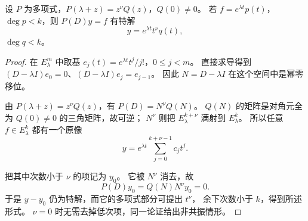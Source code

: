 \begin{proposition}[非齐次项与共振]
设 $P$ 为多项式，$P(\lambda+z)=z^\nu Q(z)$，$Q(0)\ne0$。
若 $f=e^{\lambda t}p(t)$，$\deg p<k$，则 $P(D)y=f$ 有特解
\[
 y=e^{\lambda t}t^\nu q(t),
\]
$\deg q<k$。
\end{proposition}
\begin{proof}
在 $E_\lambda^m$ 中取基 $e_j(t)=e^{\lambda t}t^j/j!$，$0\leq j<m$。
直接求导得到 $(D-\lambda I)e_0=0$、$(D-\lambda I)e_j=e_{j-1}$。
因此 $N=D-\lambda I$ 在这个空间中是幂零移位。

由 $P(\lambda+z)=z^\nu Q(z)$，有 $P(D)=N^\nu Q(N)$。
$Q(N)$ 的矩阵是对角元全为 $Q(0)\ne0$ 的三角矩阵，故可逆；
$N^\nu$ 则把 $E_\lambda^{k+\nu}$ 满射到 $E_\lambda^k$。
所以任意 $f\in E_\lambda^k$ 都有一个原像
\[
 y=e^{\lambda t}\sum_{j=0}^{k+\nu-1}c_jt^j.
\]

把其中次数小于 $\nu$ 的项记为 $y_0$。
它被 $N^\nu$ 消去，故 
\[
 P(D)y_0=Q(N)N^\nu y_0=0.
\]
于是 $y-y_0$ 仍为特解，而它的多项式部分可提出 $t^\nu$，
余下次数小于 $k$，得到所述形式。
$\nu=0$ 时无需去掉低次项，同一论证给出非共振情形。
\end{proof}
